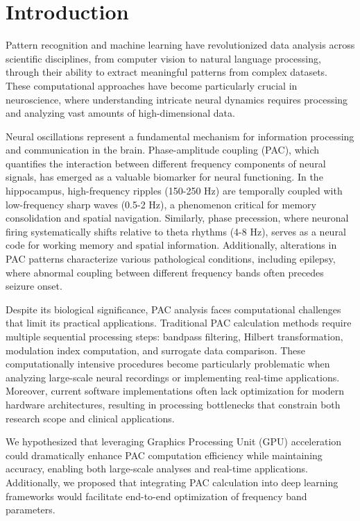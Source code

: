 
\section{Introduction}
Pattern recognition and machine learning have revolutionized data analysis across scientific disciplines, from computer vision to natural language processing, through their ability to extract meaningful patterns from complex datasets. These computational approaches have become particularly crucial in neuroscience, where understanding intricate neural dynamics requires processing and analyzing vast amounts of high-dimensional data.

Neural oscillations represent a fundamental mechanism for information processing and communication in the brain. Phase-amplitude coupling (PAC), which quantifies the interaction between different frequency components of neural signals, has emerged as a valuable biomarker for neural functioning. In the hippocampus, high-frequency ripples (150-250 Hz) are temporally coupled with low-frequency sharp waves (0.5-2 Hz), a phenomenon critical for memory consolidation and spatial navigation. Similarly, phase precession, where neuronal firing systematically shifts relative to theta rhythms (4-8 Hz), serves as a neural code for working memory and spatial information. Additionally, alterations in PAC patterns characterize various pathological conditions, including epilepsy, where abnormal coupling between different frequency bands often precedes seizure onset.

Despite its biological significance, PAC analysis faces computational challenges that limit its practical applications. Traditional PAC calculation methods require multiple sequential processing steps: bandpass filtering, Hilbert transformation, modulation index computation, and surrogate data comparison. These computationally intensive procedures become particularly problematic when analyzing large-scale neural recordings or implementing real-time applications. Moreover, current software implementations often lack optimization for modern hardware architectures, resulting in processing bottlenecks that constrain both research scope and clinical applications.

We hypothesized that leveraging Graphics Processing Unit (GPU) acceleration could dramatically enhance PAC computation efficiency while maintaining accuracy, enabling both large-scale analyses and real-time applications. Additionally, we proposed that integrating PAC calculation into deep learning frameworks would facilitate end-to-end optimization of frequency band parameters.

